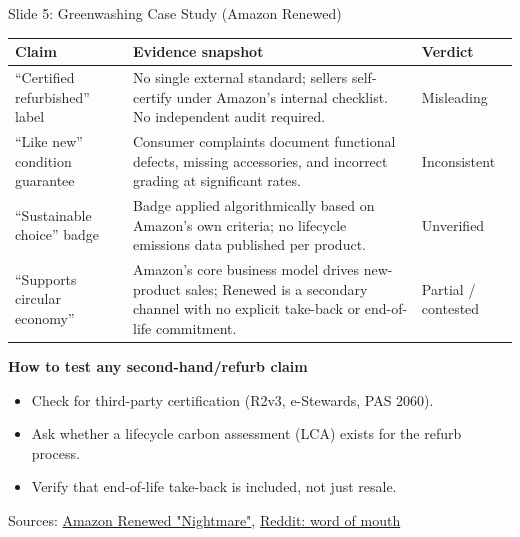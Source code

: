 \documentclass[aspectratio=169]{beamer}
\begin{document}
\begin{frame}{Slide 5: Greenwashing Case Study (Amazon Renewed)}
\scriptsize
\begin{tabular}{p{2.5cm}p{5.6cm}p{2.2cm}}
\toprule
Claim & Evidence snapshot & Verdict \\
\midrule
``Certified refurbished'' label & No single external standard; sellers self-certify under Amazon's internal checklist. No independent audit required. & Misleading \\
``Like new'' condition guarantee & Consumer complaints document functional defects, missing accessories, and incorrect grading at significant rates. & Inconsistent \\
``Sustainable choice'' badge & Badge applied algorithmically based on Amazon's own criteria; no lifecycle emissions data published per product. & Unverified \\
``Supports circular economy'' & Amazon's core business model drives new-product sales; Renewed is a secondary channel with no explicit take-back or end-of-life commitment. & Partial / contested \\
\bottomrule
\end{tabular}

\vspace{0.15cm}
\textbf{How to test any second-hand/refurb claim}
\begin{itemize}
  \item Check for third-party certification (R2v3, e-Stewards, PAS 2060).
  \item Ask whether a lifecycle carbon assessment (LCA) exists for the refurb process.
  \item Verify that end-of-life take-back is included, not just resale.
\end{itemize}
\vspace{0.05cm}
\tiny Sources: \href{https://medium.com/@blakewhole/my-amazon-renewed-laptop-nightmare-as-told-through-the-works-of-vincent-van-gogh-a3d52ce31922}{Amazon Renewed "Nightmare"}, \href{https://www.reddit.com/r/amazonprime/comments/1qx8q6d/dont_order_refurbished_devices_from_amazon/}{Reddit: word of mouth}
\end{frame}
\end{document}
